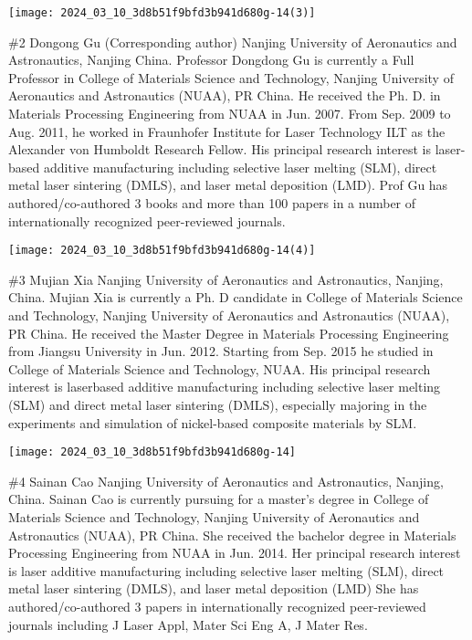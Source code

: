 \documentclass[10pt]{article}
\begin{document}
\begin{center}
\texttt{[image: 2024\_03\_10\_3d8b51f9bfd3b941d680g-14(3)]}
\end{center}

\#2 Dongong Gu (Corresponding author) Nanjing University of Aeronautics and Astronautics, Nanjing China. Professor Dongdong Gu is currently a Full Professor in College of Materials Science and Technology, Nanjing University of Aeronautics and Astronautics (NUAA), PR China. He received the Ph. D. in Materials Processing Engineering from NUAA in Jun. 2007. From Sep. 2009 to Aug. 2011, he worked in Fraunhofer Institute for Laser Technology ILT as the Alexander von Humboldt Research Fellow. His principal research interest is laser-based additive manufacturing including selective laser melting (SLM), direct metal laser sintering (DMLS), and laser metal deposition (LMD). Prof Gu has authored/co-authored 3 books and more than 100 papers in a number of internationally recognized peer-reviewed journals.

\begin{center}
\texttt{[image: 2024\_03\_10\_3d8b51f9bfd3b941d680g-14(4)]}
\end{center}

\#3 Mujian Xia Nanjing University of Aeronautics and Astronautics, Nanjing, China. Mujian Xia is currently a $\mathrm{Ph}$. D candidate in College of Materials Science and Technology, Nanjing University of Aeronautics and Astronautics (NUAA), PR China. He received the Master Degree in Materials Processing Engineering from Jiangsu University in Jun. 2012. Starting from Sep. 2015 he studied in College of Materials Science and Technology, NUAA. His principal research interest is laserbased additive manufacturing including selective laser melting (SLM) and direct metal laser sintering (DMLS), especially majoring in the experiments and simulation of nickel-based composite materials by SLM.

\begin{center}
\texttt{[image: 2024\_03\_10\_3d8b51f9bfd3b941d680g-14]}
\end{center}

\#4 Sainan Cao Nanjing University of Aeronautics and Astronautics, Nanjing, China. Sainan Cao is currently pursuing for a master's degree in College of Materials Science and Technology, Nanjing University of Aeronautics and Astronautics (NUAA), PR China. She received the bachelor degree in Materials Processing Engineering from NUAA in Jun. 2014. Her principal research interest is laser additive manufacturing including selective laser melting (SLM), direct metal laser sintering (DMLS), and laser metal deposition (LMD) She has authored/co-authored 3 papers in internationally recognized peer-reviewed journals including J Laser Appl, Mater Sci Eng A, J Mater Res.
\end{document}
